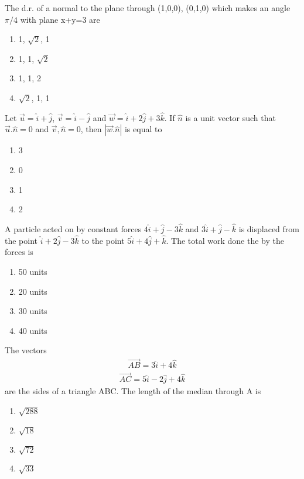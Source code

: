 \item The d.r. of a normal to the plane through (1,0,0), (0,1,0) which makes an angle $\pi/4$ with plane x+y=3 are
\begin{enumerate}
\item 1, $\sqrt{2}$, 1
\item 1, 1, $\sqrt{2}$
\item 1, 1, 2
\item $\sqrt{2}$, 1, 1
\end{enumerate}

\item Let $\overrightarrow{u}=\hat{i}+\hat{j}$, $\overrightarrow{v}=\hat{i}-\hat{j}$ and $\overrightarrow{w}=\hat{i}+2\hat{j}+3\hat{k}$. If $\hat{n}$ is a unit vector such that $\overrightarrow{u}.\hat{n}=0$ and $\overrightarrow{v},\hat{n}=0$, then $|\overrightarrow{w}.\hat{n}|$ is equal to
\begin{enumerate}
\item 3
\item 0
\item 1
\item 2
\end{enumerate}

\item A particle acted on by constant forces $4\hat{i}+\hat{j}-3\hat{k}$ and $3\hat{i}+\hat{j}-\hat{k}$ is displaced from the point $\hat{i}+2\hat{j}-3\hat{k}$ to the point $5\hat{i}+4\hat{j}+\hat{k}$. The total work done the by the forces is
\begin{enumerate}
\item 50 units
\item 20 units
\item 30 units
\item 40 units
\end{enumerate}

\item The vectors 
\begin{align*}
\overrightarrow{AB} = 3\hat{i} + 4\hat{k} 
\end{align*}
\begin{align*}
\overrightarrow{AC} = 5\hat{i} - 2\hat{j} + 4\hat{k}
\end{align*}
 are the sides of a triangle ABC. The length of the median through A is
\begin{enumerate}
\item $\sqrt{288}$
\item $\sqrt{18}$
\item $\sqrt{72}$
\item $\sqrt{33}$
\end{enumerate}

